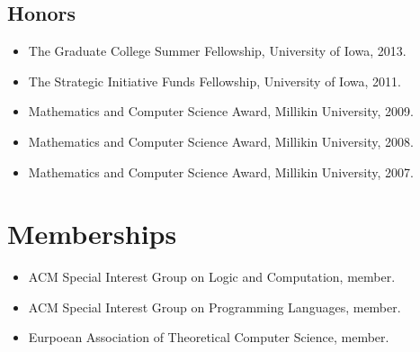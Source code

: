 \documentclass{article}
\begin{document}
  \subsection{Honors}
  \begin{itemize}
  \item[] The Graduate College Summer Fellowship, University of Iowa, 2013.

  \item[] The Strategic Initiative Funds Fellowship, University of Iowa, 2011.
    
  \item[] Mathematics and Computer Science Award, Millikin University, 2009.  

  \item[] Mathematics and Computer Science Award, Millikin University, 2008.  

  \item[] Mathematics and Computer Science Award, Millikin University, 2007.
  \end{itemize}

  \section{Memberships}
  \label{sec:memberships}
  \begin{itemize}
  \item[] ACM Special Interest Group on Logic and Computation, member.
    
  \item[] ACM Special Interest Group on Programming Languages, member.
    
  \item[] Eurpoean Association of Theoretical Computer Science, member.
  \end{itemize}
\end{document}
